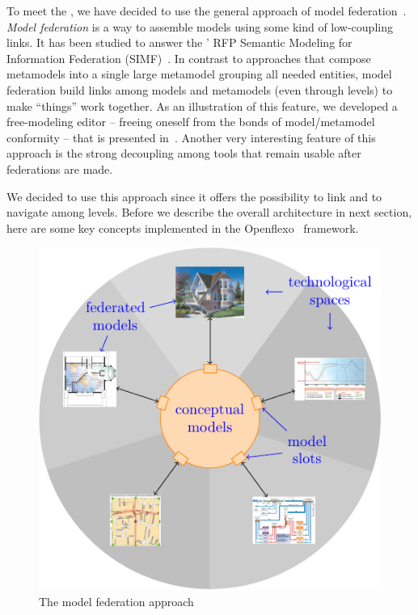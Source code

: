 

To meet the \mpc, we have decided to use the general
approach of model federation~\cite{Golra2016-federation}. \emph{Model
  federation} is a way to assemble models using some kind of
low-coupling links. It has been studied to answer the \OMG' RFP
Semantic Modeling for Information Federation (SIMF)~\cite{simf}. In
contrast to approaches that compose metamodels into a single large
metamodel grouping all needed entities, model federation build links
among models and metamodels (even through levels) to make ``things''
work together. As an illustration of this feature, we developed a
free-modeling editor -- freeing oneself from the bonds of
model/metamodel conformity -- that is presented
in~\cite{models2016-freemodel}. Another very interesting feature of
this approach is the strong decoupling among tools that remain usable
after federations are made.

We decided to use this approach since it offers the possibility to
link and to navigate among levels. Before we describe the overall
architecture in next section, here are some key concepts implemented
in the Openflexo~\cite{openflexo_link} framework.


\begin{figure}[t]
    \centering
    \includegraphics[width=\columnwidth]{Figures/federation.pdf}
    \caption{The model federation approach}
    \label{fig:mf}
\end{figure}

